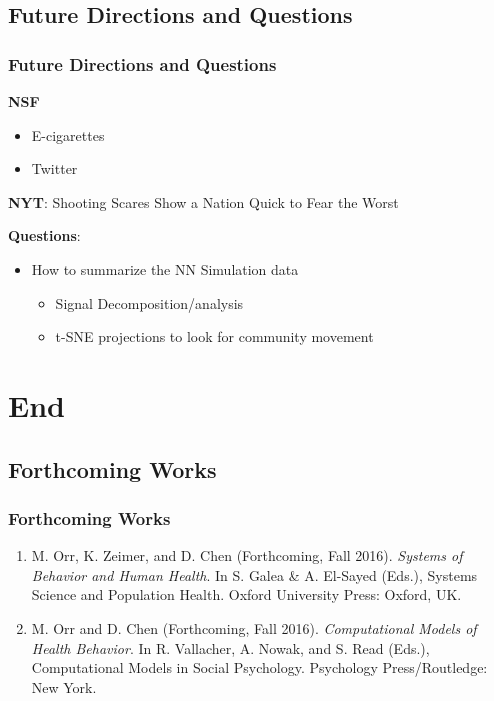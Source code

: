 \documentclass[compress]{beamer}
\begin{document}
\subsection{Future Directions and Questions}

    \begin{frame}[Basic2]\frametitle{Future Directions and Questions}
        \textbf{NSF}
        \begin{itemize}
            \item E-cigarettes
            \item Twitter
        \end{itemize}

        \textbf{NYT}: Shooting Scares Show a Nation Quick to Fear the Worst

       \textbf{Questions}:
     \begin{itemize}
            \item How to summarize the NN Simulation data
            \begin{itemize}
                \item Signal Decomposition/analysis
                \item t-SNE projections to look for community movement
            \end{itemize}
        \end{itemize}
    \end{frame}
    
\section{End}

\subsection{Forthcoming Works}
    \begin{frame}[Basic2] \frametitle{Forthcoming Works}
        \begin{enumerate}
            \item M. Orr, K. Zeimer, and D. Chen (Forthcoming, Fall 2016).
            \textit{Systems of Behavior and Human Health}. In S. Galea \& A. El-Sayed (Eds.),
            Systems Science and Population Health. Oxford University Press: Oxford, UK.

            \item M. Orr and D. Chen (Forthcoming, Fall 2016).
            \textit{Computational Models of Health Behavior}.
            In R. Vallacher, A. Nowak, and S. Read (Eds.),
            Computational Models in Social Psychology. Psychology Press/Routledge: New York.
        \end{enumerate}
    \end{frame}
\end{document}
